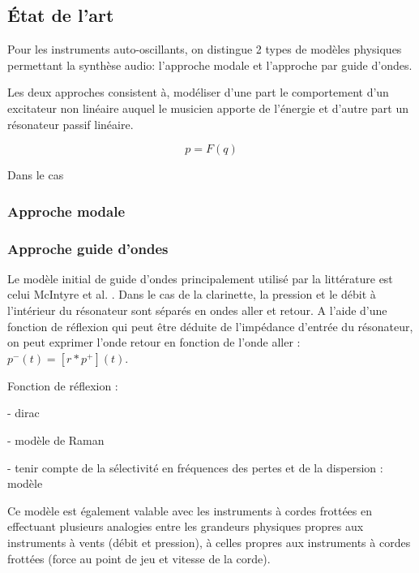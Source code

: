 \subsection{État de l'art}

Pour les instruments auto-oscillants, on distingue 2 types de modèles physiques permettant la synthèse audio: l'approche modale et l'approche par guide d'ondes.

Les deux approches consistent à, modéliser d'une part le comportement d'un excitateur non linéaire auquel le musicien apporte de l'énergie et d'autre part un résonateur passif linéaire.

$$p = F(q)$$ %

Dans le cas


\subsubsection{Approche modale}

\subsubsection{Approche guide d'ondes}

Le modèle initial de guide d'ondes principalement utilisé par la littérature est celui McIntyre et al. \cite{mcintyre_oscillations_1983}. Dans le cas de la clarinette, la pression et le débit à l'intérieur du résonateur sont séparés en ondes aller et retour. 
A l'aide d'une fonction de réflexion qui peut être déduite de l'impédance d'entrée du résonateur, on peut exprimer l'onde retour en fonction de l'onde aller : $p^-(t) = [r * p^+] (t)$.

Fonction de réflexion :

- dirac

- modèle de Raman \cite{raman1918mechanical}

- tenir compte de la sélectivité en fréquences des pertes et de la dispersion : modèle


Ce modèle est également valable avec les instruments à cordes frottées \cite{ollivier_idealized_2004} en effectuant plusieurs analogies entre les grandeurs physiques propres aux instruments à vents (débit et pression), à celles propres aux instruments à cordes frottées (force au point de jeu et vitesse de la corde).

